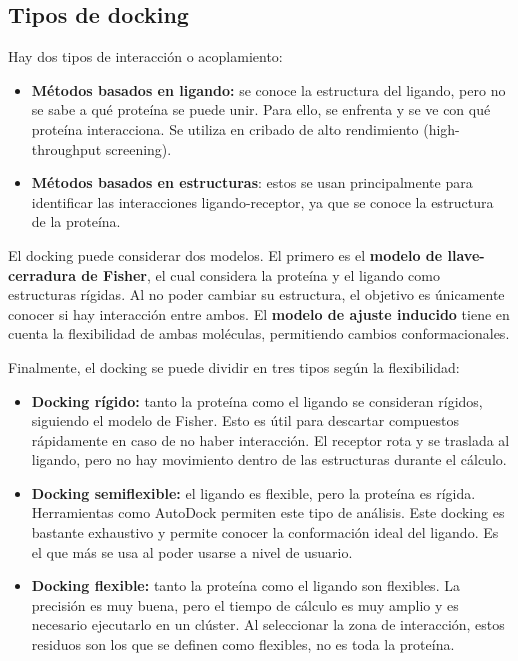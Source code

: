 \subsection{Tipos de docking}
Hay dos tipos de interacción o acoplamiento:
\begin{itemize}
\item \textbf{Métodos basados en ligando:} se conoce la estructura del ligando, pero no se sabe a qué proteína se puede unir. Para ello, se enfrenta y se ve con qué proteína interacciona. Se utiliza en cribado de alto rendimiento (high-throughput screening).
\item \textbf{Métodos basados en estructuras}: estos se usan principalmente para identificar las interacciones ligando-receptor, ya que se conoce la estructura de la proteína.
\end{itemize}

El docking puede considerar dos modelos. El primero es el \textbf{modelo de llave-cerradura de Fisher}, el cual considera la proteína y el ligando como estructuras rígidas. Al no poder cambiar su estructura, el objetivo es únicamente conocer si hay interacción entre ambos. El \textbf{modelo de ajuste inducido} tiene en cuenta la flexibilidad de ambas moléculas, permitiendo cambios conformacionales.

Finalmente, el docking se puede dividir en tres tipos según la flexibilidad:
\begin{itemize}
\item \textbf{Docking rígido:} tanto la proteína como el ligando se consideran rígidos, siguiendo el modelo de Fisher. Esto es útil para descartar compuestos rápidamente en caso de no haber interacción. El receptor rota y se traslada al ligando, pero no hay movimiento dentro de las estructuras durante el cálculo.
\item \textbf{Docking semiflexible:} el ligando es flexible, pero la proteína es rígida. Herramientas como AutoDock permiten este tipo de análisis. Este docking es bastante exhaustivo y permite conocer la conformación ideal del ligando. Es el que más se usa al poder usarse a nivel de usuario.
\item \textbf{Docking flexible:} tanto la proteína como el ligando son flexibles. La precisión es muy buena, pero el tiempo de cálculo es muy amplio y es necesario ejecutarlo en un clúster. Al seleccionar la zona de interacción, estos residuos son los que se definen como flexibles, no es toda la proteína. 
\end{itemize}

